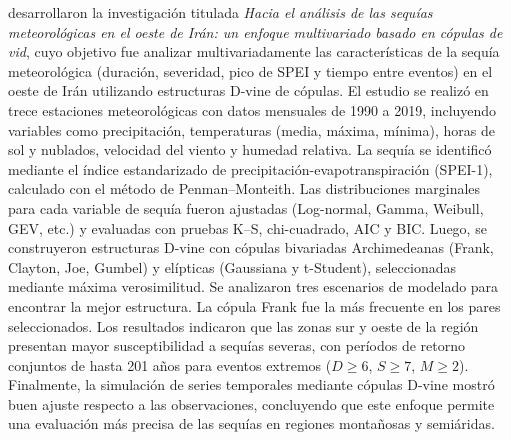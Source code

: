 \textcite{Jahannemaei2023} desarrollaron la investigación titulada \emph{Hacia el análisis de las sequías meteorológicas en el oeste de Irán: un enfoque multivariado basado en cópulas de vid}, cuyo objetivo fue analizar multivariadamente las características de la sequía meteorológica (duración, severidad, pico de SPEI y tiempo entre eventos) en el oeste de Irán utilizando estructuras D-vine de cópulas. El estudio se realizó en trece estaciones meteorológicas con datos mensuales de 1990 a 2019, incluyendo variables como precipitación, temperaturas (media, máxima, mínima), horas de sol y nublados, velocidad del viento y humedad relativa. La sequía se identificó mediante el índice estandarizado de precipitación-evapotranspiración (SPEI-1), calculado con el método de Penman–Monteith. Las distribuciones marginales para cada variable de sequía fueron ajustadas (Log-normal, Gamma, Weibull, GEV, etc.) y evaluadas con pruebas K--S, chi-cuadrado, AIC y BIC. Luego, se construyeron estructuras D-vine con cópulas bivariadas Archimedeanas (Frank, Clayton, Joe, Gumbel) y elípticas (Gaussiana y t-Student), seleccionadas mediante máxima verosimilitud. Se analizaron tres escenarios de modelado para encontrar la mejor estructura. La cópula Frank fue la más frecuente en los pares seleccionados. Los resultados indicaron que las zonas sur y oeste de la región presentan mayor susceptibilidad a sequías severas, con períodos de retorno conjuntos de hasta 201 años para eventos extremos ($D \geq 6$, $S \geq 7$, $M \geq 2$). Finalmente, la simulación de series temporales mediante cópulas D-vine mostró buen ajuste respecto a las observaciones, concluyendo que este enfoque permite una evaluación más precisa de las sequías en regiones montañosas y semiáridas.

